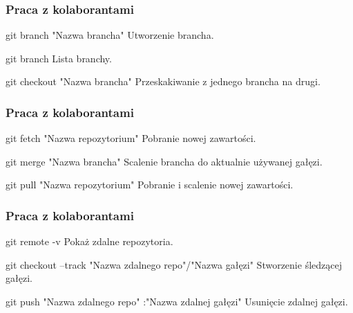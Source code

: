 \documentclass[9pt]{beamer}
\begin{document}
		
	\begin{frame}
		\frametitle{Praca z kolaborantami}

			\begin{block}{git branch "Nazwa brancha"}
				Utworzenie brancha.
			\end{block}

			\begin{block}{git branch}
				Lista branchy.
			\end{block}	

			\begin{block}{git checkout "Nazwa brancha"}
				Przeskakiwanie z jednego brancha na drugi.
			\end{block}	
			
					
						
	\end{frame}
	
		
	\begin{frame}
		\frametitle{Praca z kolaborantami}

			\begin{block}{git fetch "Nazwa repozytorium"}
				Pobranie nowej zawartości.
			\end{block}

			\begin{block}{git merge "Nazwa brancha"}
				Scalenie brancha do aktualnie używanej gałęzi.
			\end{block}	
			
			\begin{block}{git pull "Nazwa repozytorium"}
				Pobranie i scalenie nowej zawartości.
			\end{block}	
					
						
	\end{frame}
	
		
	\begin{frame}
		\frametitle{Praca z kolaborantami}

			\begin{block}{git remote -v}
				Pokaż zdalne repozytoria.
			\end{block}	

			\begin{block}{git checkout --track "Nazwa zdalnego repo"/"Nazwa gałęzi"}
				Stworzenie śledzącej gałęzi.
			\end{block}	
			
			\begin{block}{git push "Nazwa zdalnego repo" :"Nazwa zdalnej gałęzi"}
				Usunięcie zdalnej gałęzi.
			\end{block}	
						
	\end{frame}
	
\end{document}
